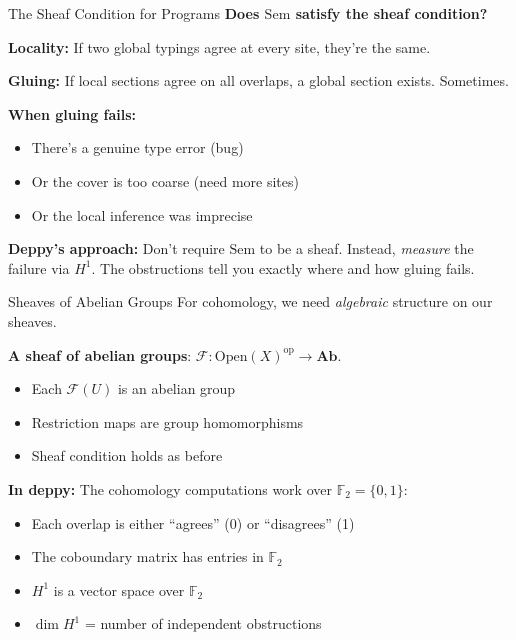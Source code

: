 \documentclass[aspectratio=169,10pt]{beamer}
\newcommand{\yes}{\textcolor{good}{\checkmark}}
\newcommand{\Fscr}{\mathcal{F}}
\newcommand{\Sem}{\mathrm{Sem}}
\newcommand{\op}{\mathrm{op}}
\newcommand{\Ab}{\mathbf{Ab}}
\newcommand{\Open}{\mathrm{Open}}
\begin{document}
\begin{frame}{The Sheaf Condition for Programs}
\textbf{Does $\Sem$ satisfy the sheaf condition?}

\textbf{Locality:} If two global typings agree at every site, they're the same. \yes

\textbf{Gluing:} If local sections agree on all overlaps, a global section exists. \textcolor{meh}{Sometimes.}

\vspace{0.5em}
\textbf{When gluing fails:}
\begin{itemize}
  \item There's a genuine type error (bug)
  \item Or the cover is too coarse (need more sites)
  \item Or the local inference was imprecise
\end{itemize}

\textbf{Deppy's approach:} Don't require $\Sem$ to be a sheaf. Instead, \emph{measure} the failure via $H^1$. The obstructions tell you exactly where and how gluing fails.
\end{frame}

\begin{frame}{Sheaves of Abelian Groups}
For cohomology, we need \emph{algebraic} structure on our sheaves.

\textbf{A sheaf of abelian groups}: $\Fscr : \Open(X)^{\op} \to \Ab$.
\begin{itemize}
  \item Each $\Fscr(U)$ is an abelian group
  \item Restriction maps are group homomorphisms
  \item Sheaf condition holds as before
\end{itemize}

\textbf{In deppy:} The cohomology computations work over $\mathbb{F}_2 = \{0, 1\}$:
\begin{itemize}
  \item Each overlap is either ``agrees'' (0) or ``disagrees'' (1)
  \item The coboundary matrix has entries in $\mathbb{F}_2$
  \item $H^1$ is a vector space over $\mathbb{F}_2$
  \item $\dim H^1$ = number of independent obstructions
\end{itemize}
\end{frame}
\end{document}
